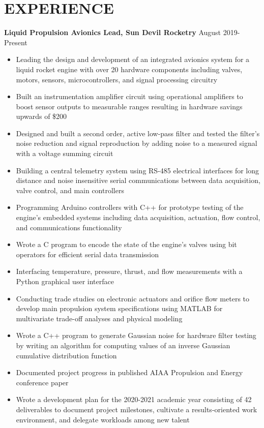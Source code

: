 \documentclass{article}
\begin{document}
\section{EXPERIENCE}
\textbf{Liquid Propulsion Avionics Lead, Sun Devil Rocketry}
\hfill
\vspace{0.5em}
August 2019-Present
\begin{itemize}
	\item{Leading the design and development of an integrated avionics system for a liquid rocket engine with over 20 hardware components including valves, motors, sensors, microcontrollers, and signal processing circuitry}
	\item{Built an instrumentation amplifier circuit using operational amplifiers to boost sensor outputs to measurable ranges resulting in hardware savings upwards of \$200}
	\item{Designed and built a second order, active low-pass filter and tested the filter's noise reduction and signal reproduction by adding noise to a measured signal with a voltage summing circuit}
	\item{Building a central telemetry system using RS-485 electrical interfaces for long distance and noise insensitive serial communications between data acquisition, valve control, and main controllers}
	\item{Programming Arduino controllers with C++ for prototype testing of the engine's embedded systems including data acquisition, actuation, flow control, and communications functionality}
	\item{Wrote a C program to encode the state of the engine's valves using bit operators for efficient serial data transmission}
	\item{Interfacing temperature, pressure, thrust, and flow measurements with a Python graphical user interface}
	\item{Conducting trade studies on electronic actuators and orifice flow meters to develop main propulsion system specifications using MATLAB for multivariate trade-off analyses and physical modeling}
	\item{Wrote a C++ program to generate Gaussian noise for hardware filter testing by writing an algorithm for computing values of an inverse Gaussian cumulative distribution function}
	\item{Documented project progress in published AIAA Propulsion and Energy conference paper}
	\item{Wrote a development plan for the 2020-2021 academic year consisting of 42 deliverables to document project milestones, cultivate a results-oriented work environment, and delegate workloads among new talent}
\end{itemize}
\end{document}
